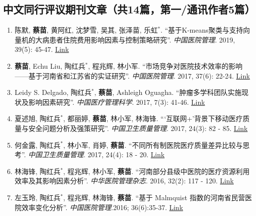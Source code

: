 \documentclass[11pt, a4paper]{article}
\newcommand{\years}[1]{\marginnote{\scriptsize #1}}
\begin{document}
	\subsection*{中文同行评议期刊文章（共14篇，第一/通讯作者5篇）}
	\begin{enumerate}[leftmargin=0ex,itemsep=1ex]
		\item \years{2019}陈默, \textbf{蔡苗}, 黄阿红, 沈梦雪, 吴其, 张泽苗, 乐虹$^\ast$. “基于K-means聚类与支持向量机的大病患者住院费用影响因素与控制策略研究”. \emph{中国医院管理}. 2019, 39(5): 45-47. \href{http://d.old.wanfangdata.com.cn/Periodical/zgyygl201905018}{Link}
		
		\item \years{2017}\textcolor{RubineRed}{\textbf{蔡苗}}, Echu Liu, 陶红兵$^\ast$, 程兆辉, 林小军. “市场竞争对医院技术效率的影响——基于河南省和江苏省的实证研究”. \emph{中国医院管理}. 2017, 37(6): 22-24. \href{http://www.cnki.com.cn/Article/CJFDTotal-YYGL201706012.htm}{Link}
		
		\item Leidy S. Delgado, 陶红兵$^\ast$, \textbf{蔡苗}, Ashleigh Oguagha. “肿瘤多学科团队实施现状及影响因素研究”. \emph{中国医疗管理科学}. 2017, 7(3): 41-46. \href{http://www.cnki.com.cn/Article/CJFDTOTAL-YLGL201703008.htm}{Link}
		
		\item 夏述旭, 陶红兵$^\ast$, 都丽婷, \textbf{蔡苗}, 林小军, 林海锋. “‘互联网+’背景下移动医疗质量与安全问题分析及强策研究”. \emph{中国卫生质量管理}. 2017, 24(3): 82 - 85. \href{http://www.cnki.com.cn/Article/CJFDTOTAL-WSJG201703030.htm}{Link}
		
		\item 何金露, 陶红兵$^\ast$, 林小军, 肖婷, \textbf{蔡苗}. “不同所有制医院医疗质量差异比较与思考”. \emph{中国卫生质量管理}. 2017, 24(4): 18 - 20. \href{http://www.cnki.com.cn/Article/CJFDTOTAL-WSJG201704010.htm}{Link}
		
		\item \years{2016}林海锋, 陶红兵$^\ast$, 程兆辉, 林小军, \textbf{蔡苗}. “河南部分县级中医院的医疗资源利用效率及其影响因素分析”. \emph{中华医院管理杂志}. 2016, 32(2): 117 - 120. \href{http://xuewen.cnki.net/CMFD-1016781136.nh.html}{Link}
		
		\item 左玉玲, 陶红兵$^\ast$, 程兆辉, 林海锋, \textbf{蔡苗}. “基于 Malmquist 指数的河南省民营医院效率变化分析”. \emph{中国医院管理}.2016; 36(6):35-37. \href{http://www.cnki.com.cn/Article/CJFDTOTAL-YYGL201606020.htm}{Link}
		

\end{enumerate}
\end{document}
